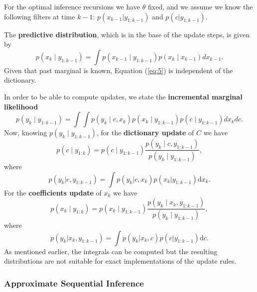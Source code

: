 \documentclass{mldsmsc}
\begin{document}
For the optimal inference recursions we have $\theta$ fixed, and we assume we know the following filters at time $k - 1$: $p(x_{k-1}|y_{1:k-1})$ and $p(c|y_{1:k-1})$. \newline

\noindent The \textbf{predictive distribution}, which is in the base of the update steps, is given by
\begin{equation} \label{eq:5}
    p(x_k \mid y_{1:k-1}) = \int p(x_{k-1} \mid y_{1:k-1}) p(x_k \mid x_{k-1}) dx_{k-1}.
\end{equation}
Given that past marginal is known, Equation (\ref{eq:5}) is independent of the dictionary. \newline

\noindent In order to be able to compute updates, we state the \textbf{incremental marginal likelihood}
\begin{equation}
    p(y_k \mid y_{1:k-1}) = \int \int p(y_k \mid c, x_k) p(x_k \mid y_{1:k-1}) p(c \mid y_{1:k-1}) dx_k dc.
\end{equation}
Now, knowing $p(y_k \mid y_{1:k-1})$, for the \textbf{dictionary update} of $C$ we have
\begin{equation}
    p(c \mid y_{1:k}) = p(c \mid y_{1:k-1}) \frac{p(y_k \mid c, y_{1:k-1})}{p(y_k \mid y_{1:k-1})},
\end{equation}
where
\begin{equation} \label{eq:14}
    p(y_k | c, y_{1:k-1}) = \int p(y_k | c, x_k) p(x_k | y_{1:k-1}) \text{d}x_k.
\end{equation}
For the \textbf{coefficients update} of $x_k$ we have
\begin{equation}\label{eq:15}
    p(x_k \mid y_{1:k}) = p(x_k \mid y_{1:k-1})  \frac{p(y_k \mid x_k, y_{1:k-1})}{p(y_k \mid y_{1:k-1})},
\end{equation}
where
\begin{equation}
    p(y_k | x_k, y_{1:k-1}) = \int p(y_k | x_k, c) p(c | y_{1:k-1})\text{d}c.
\end{equation}
As mentioned earlier, the integrals can be computed but the resulting distributions are not suitable for exact implementations of the update rules.

\subsubsection{Approximate Sequential Inference}
\end{document}
